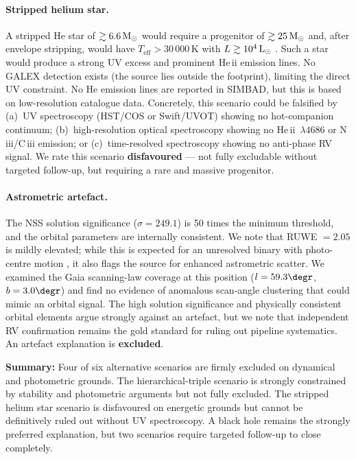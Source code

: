 \documentclass[usenatbib,fleqn]{mnras}
\newcommand{\Msun}{{\rm M}_\odot}
\newcommand{\Lsun}{{\rm L}_\odot}
\begin{document}
\paragraph{Stripped helium star.}
A stripped He star of $\gtrsim 6.6\,\Msun$ would require a
progenitor of $\gtrsim 25\,\Msun$ and, after envelope stripping,
would have $T_\mathrm{eff} > 30\,000$\,K with
$L \gtrsim 10^4\,\Lsun$ \citep{Gotberg2018}.  Such a star
would produce a strong UV excess and prominent He\,{\sc ii}
emission lines.  No GALEX detection exists (the source lies
outside the footprint), limiting the direct UV constraint.
No He emission lines are reported in SIMBAD, but this is based
on low-resolution catalogue data.  Concretely, this scenario
could be falsified by (a)~UV spectroscopy (HST/COS or
Swift/UVOT) showing no hot-companion continuum;
(b)~high-resolution optical spectroscopy showing no
He\,{\sc ii}~$\lambda 4686$ or N\,{\sc iii}/C\,{\sc iii}
emission; or (c)~time-resolved spectroscopy showing no
anti-phase RV signal.  We rate this scenario
\textbf{disfavoured} --- not fully excludable without
targeted follow-up, but requiring a rare and massive progenitor.

\paragraph{Astrometric artefact.}
The NSS solution significance ($\sigma = 249.1$) is 50 times the
minimum threshold, and the orbital parameters are internally
consistent.  We note that RUWE $= 2.05$ is mildly elevated;
while this is expected for an unresolved binary with photo-centre
motion \citep{LindeGren2018}, it also flags the source for
enhanced astrometric scatter.  We examined the Gaia scanning-law
coverage at this position ($l = 59.3\degr$, $b = 3.0\degr$) and
find no evidence of anomalous scan-angle clustering that could
mimic an orbital signal.  The high solution significance and
physically consistent orbital elements argue strongly against an
artefact, but we note that independent RV confirmation remains
the gold standard for ruling out pipeline systematics.
An artefact explanation is \textbf{excluded}.

\medskip\noindent
\textbf{Summary:} Four of six alternative scenarios are firmly
excluded on dynamical and photometric grounds.  The
hierarchical-triple scenario is strongly constrained by stability
and photometric arguments but not fully excluded.  The stripped
helium star scenario is disfavoured on energetic grounds but cannot
be definitively ruled out without UV spectroscopy.  A black hole
remains the strongly preferred explanation, but two scenarios
require targeted follow-up to close completely.
\end{document}
